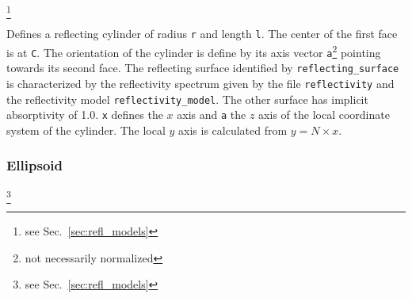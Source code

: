 \documentclass[10pt,a4paper,titlepage]{article}
\begin{document}







\footnote{see Sec.~\ref{sec:refl_models}}


\vspace{0.25cm}
Defines a reflecting cylinder of radius {\tt r} and length {\tt l}. The center of the first face is at {\tt C}. The orientation of the cylinder is define by its axis vector {\tt a}\footnote{not necessarily normalized} pointing towards its second face. The reflecting surface identified by {\tt reflecting\_surface} is characterized by the reflectivity spectrum given by the file {\tt reflectivity} and the reflectivity model {\tt reflectivity\_model}. The other surface has implicit absorptivity of 1.0. {\tt x} defines the $x$ axis and {\tt a} the $z$ axis of the local coordinate system of the cylinder. The local $y$ axis is calculated from $y = N \times x$.

\subsubsection{Ellipsoid}










\footnote{see Sec.~\ref{sec:refl_models}}

\end{document}
